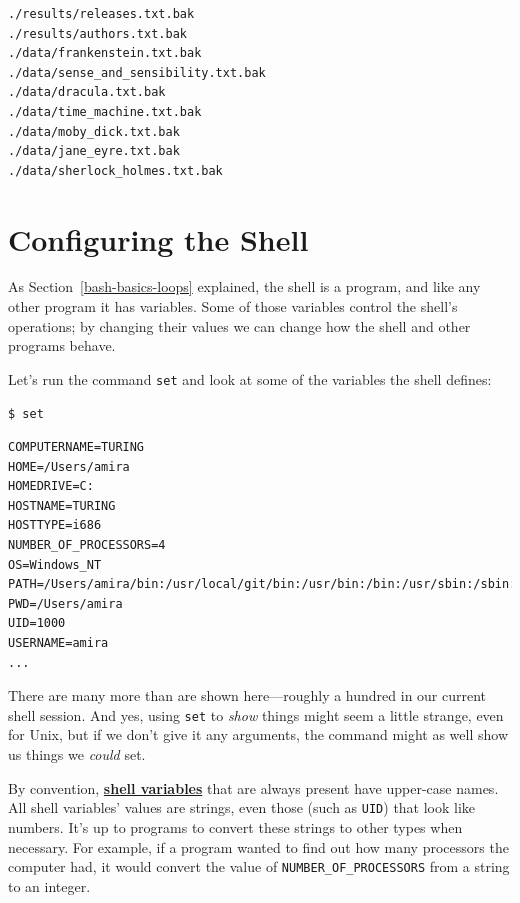 \documentclass[
]{krantz}
\newcommand{\gref}[2]{\hyperlink{#2}{\textbf{#1}}}
\begin{document}
\begin{verbatim}
./results/releases.txt.bak
./results/authors.txt.bak
./data/frankenstein.txt.bak
./data/sense_and_sensibility.txt.bak
./data/dracula.txt.bak
./data/time_machine.txt.bak
./data/moby_dick.txt.bak
./data/jane_eyre.txt.bak
./data/sherlock_holmes.txt.bak
\end{verbatim}

\hypertarget{bash-advanced-vars}{%
\section{Configuring the Shell}\label{bash-advanced-vars}}

As Section~\ref{bash-basics-loops} explained,
the shell is a program,
and like any other program it has variables.
Some of those variables control the shell's operations;
by changing their values
we can change how the shell and other programs behave.

Let's run the command \texttt{set}
and look at some of the variables the shell defines:

\begin{verbatim}
$ set
\end{verbatim}

\begin{verbatim}
COMPUTERNAME=TURING
HOME=/Users/amira
HOMEDRIVE=C:
HOSTNAME=TURING
HOSTTYPE=i686
NUMBER_OF_PROCESSORS=4
OS=Windows_NT
PATH=/Users/amira/bin:/usr/local/git/bin:/usr/bin:/bin:/usr/sbin:/sbin:/usr/local/bin
PWD=/Users/amira
UID=1000
USERNAME=amira
...
\end{verbatim}

There are many more than are shown here---roughly a hundred
in our current shell session.
And yes,
using \texttt{set} to \emph{show} things might seem a little strange,
even for Unix,
but if we don't give it any arguments,
the command might as well show us things we \emph{could} set.

By convention,
\gref{shell variables}{shell\_variable} that are always present have upper-case names.
All shell variables' values are strings,
even those (such as \texttt{UID}) that look like numbers.
It's up to programs to convert these strings to other types when necessary.
For example,
if a program wanted to find out how many processors the computer had,
it would convert the value of \texttt{NUMBER\_OF\_PROCESSORS} from a string to an integer.
\end{document}
